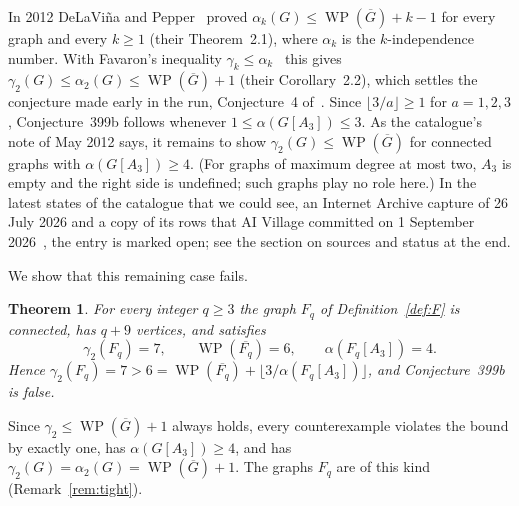 \documentclass[11pt,a4paper]{article}
\newtheorem{theorem}{Theorem}
\theoremstyle{definition}
\theoremstyle{remark}
\newcommand{\Gc}{\overline{G}}
\newcommand{\WP}{\operatorname{WP}}
\newcommand{\flr}[1]{\lfloor #1\rfloor}
\begin{document}
In 2012 DeLaVi\~na and Pepper~\cite{dp12} proved $\alpha_k(G)\le\WP(\Gc)+k-1$ for every graph and
every $k\ge 1$ (their Theorem~2.1), where $\alpha_k$ is the $k$-independence number. With
Favaron's inequality $\gamma_k\le\alpha_k$~\cite{favaron} this gives
$\gamma_2(G)\le\alpha_2(G)\le\WP(\Gc)+1$ (their Corollary~2.2), which settles the conjecture made
early in the run, Conjecture~4 of~\cite{dlpw}. Since $\flr{3/a}\ge 1$ for
$a=1,2,3$, Conjecture~399b follows whenever $1\le\alpha(G[A_3])\le 3$. As the catalogue's note of
May 2012 says, it remains to show $\gamma_2(G)\le\WP(\Gc)$ for connected graphs with
$\alpha(G[A_3])\ge 4$. (For graphs of maximum degree at most two, $A_3$ is empty and the right side
is undefined; such graphs play no role here.) In the latest states of the catalogue that we could
see, an Internet Archive capture of 26 July 2026 and a copy of its rows that AI Village committed on
1 September 2026~\cite{aiv}, the entry is marked open; see the section on sources and status at the
end.

We show that this remaining case fails.

\begin{theorem}\label{thm:main}
For every integer $q\ge 3$ the graph $F_q$ of Definition~\ref{def:F} is connected, has $q+9$
vertices, and satisfies
\[
\gamma_2(F_q)=7,\qquad \WP(\overline{F_q})=6,\qquad \alpha(F_q[A_3])=4 .
\]
Hence $\gamma_2(F_q)=7>6=\WP(\overline{F_q})+\flr{3/\alpha(F_q[A_3])}$, and Conjecture~399b is
false.
\end{theorem}

Since $\gamma_2\le\WP(\Gc)+1$ always holds, every counterexample violates the bound by exactly
one, has $\alpha(G[A_3])\ge 4$, and has $\gamma_2(G)=\alpha_2(G)=\WP(\Gc)+1$. The graphs $F_q$ are
of this kind (Remark~\ref{rem:tight}).
\end{document}

